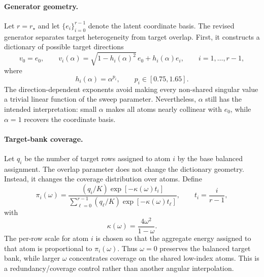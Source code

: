 
\paragraph{Generator geometry.}
Let $r=r_\star$ and let $\{e_i\}_{i=0}^{r-1}$ denote the latent coordinate
basis.  The revised generator separates target heterogeneity from target
overlap.  First, it constructs a dictionary of possible target directions
\[
    v_0=e_0,\qquad
    v_i(\alpha)
    =
    \sqrt{1-h_i(\alpha)^2}\,e_0+h_i(\alpha)e_i,
    \qquad i=1,\ldots,r-1,
\]
where
\[
    h_i(\alpha)=\alpha^{p_i},
    \qquad
    p_i\in[0.75,1.65].
\]
The direction-dependent exponents avoid making every non-shared singular value a
trivial linear function of the sweep parameter.  Nevertheless, $\alpha$ still
has the intended interpretation: small $\alpha$ makes all atoms nearly
collinear with $e_0$, while $\alpha=1$ recovers the coordinate basis.

\paragraph{Target-bank coverage.}
Let $q_i$ be the number of target rows assigned to atom $i$ by the base balanced
assignment.  The overlap parameter does not change the dictionary geometry.
Instead, it changes the coverage distribution over atoms.  Define
\[
    \pi_i(\omega)
    =
    \frac{(q_i/K)\exp[-\kappa(\omega)t_i]}
         {\sum_{\ell=0}^{r-1}(q_\ell/K)\exp[-\kappa(\omega)t_\ell]},
    \qquad
    t_i=\frac{i}{r-1},
\]
with
\[
    \kappa(\omega)=\frac{4\omega^2}{1-\omega}.
\]
The per-row scale for atom $i$ is chosen so that the aggregate energy assigned
to that atom is proportional to $\pi_i(\omega)$.  Thus $\omega=0$ preserves the
balanced target bank, while larger $\omega$ concentrates coverage on the shared
low-index atoms.  This is a redundancy/coverage control rather than another
angular interpolation.


